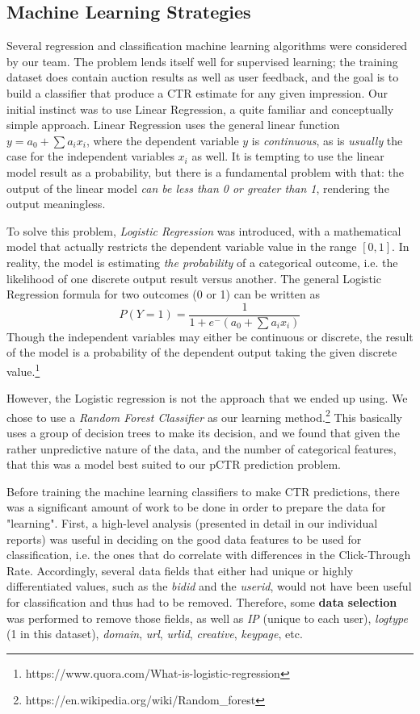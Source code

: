 \documentclass{sig-alternate-05-2015}
\begin{document}
\subsection{Machine Learning Strategies} \label{ml}
Several regression and classification machine learning algorithms were considered by our team. The problem lends itself well for supervised learning; the training dataset does contain auction results as well as user feedback, and the goal is to build a classifier that produce a CTR estimate for any given impression. Our initial instinct was to use Linear Regression, a quite familiar and conceptually simple approach. Linear Regression uses the general linear function $y = a_0 +  \sum a_i x_i$, where the dependent variable $y$ is \textit{continuous}, as is \textit{usually} the case for the independent variables $x_i$ as well. It is tempting to use the linear model result as a probability, but there is a fundamental problem with that: the output of the linear model \textit{can be less than 0 or greater than 1}, rendering the output meaningless.

To solve this problem, \textit{Logistic Regression} was introduced, with a mathematical model that actually restricts the dependent variable value in the range $[0,1]$. In reality, the model is estimating \textit{the probability} of a categorical outcome, i.e. the likelihood of one discrete output result versus another. The general Logistic Regression formula for two outcomes (0 or 1) can be written as \[P(Y=1) = \frac{1}{1+e^-(a_0+\sum a_i x_i)}\]
Though the independent variables may either be continuous or discrete, the result of the model is a probability of the dependent output taking the given discrete value.\footnote{https://www.quora.com/What-is-logistic-regression}

However, the Logistic regression is not the approach that we ended up using. We chose to use a \textit{Random Forest Classifier} as our learning method.\footnote{https://en.wikipedia.org/wiki/Random\_forest} This basically uses a group of decision trees to make its decision, and we found that given the rather unpredictive nature of the data, and the number of categorical features, that this was a model best suited to our pCTR prediction problem.

Before training the machine learning classifiers to make CTR predictions, there was a significant amount of work to be done in order to prepare the data for "learning". First, a high-level analysis (presented in detail in our individual reports) was useful in deciding on the good data features to be used for classification, i.e. the ones that do correlate with differences in the Click-Through Rate. Accordingly, several data fields that either had unique or highly differentiated values, such as the \textit{bidid} and the \textit{userid}, would not have been useful for classification and thus had to be removed. Therefore, some \textbf{data selection} was performed to remove those fields, as well as \textit{IP} (unique to each user), \textit{logtype} (1 in this dataset), \textit{domain}, \textit{url}, \textit{urlid}, \textit{creative}, \textit{keypage}, etc.
\end{document}
